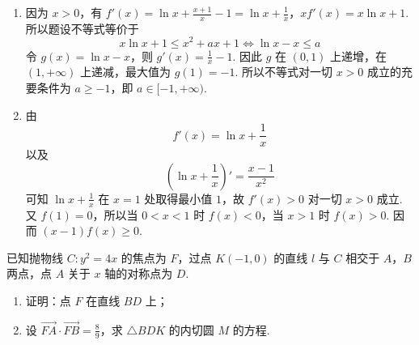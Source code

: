 \begin{solution}
\begin{enumerate}
\item 因为 \(x>0\)，有
\(f'(x)=\ln x+\frac{x+1}{x}-1=\ln x+\frac1x\)，\(xf'(x)=x\ln x+1\).
所以题设不等式等价于
\[
x\ln x+1\leqslant x^{2}+ax+1
\Longleftrightarrow \ln x-x\leqslant a
\]
令 \(g(x)=\ln x-x\)，则 \(g'(x)=\frac{1}{x}-1\). 因此 \(g\) 在 \((0,1)\) 上递增，在
\((1,+\infty)\) 上递减，最大值为 \(g(1)=-1\). 所以不等式对一切 \(x>0\) 成立的充要条件为
\(a\geqslant-1\)，即 \(a\in[-1,+\infty)\).
\item 由
\[
f'(x)=\ln x+\frac1x
\]
以及
\[
\left(\ln x+\frac1x\right)'=\frac{x-1}{x^{2}}
\]
可知 \(\ln x+\frac{1}{x}\) 在 \(x=1\) 处取得最小值 \(1\)，故 \(f'(x)>0\) 对一切 \(x>0\) 成立. 又
\(f(1)=0\)，所以当 \(0<x<1\) 时 \(f(x)<0\)，当 \(x>1\) 时 \(f(x)>0\). 因而
\((x-1)f(x)\geqslant0\).
\end{enumerate}
\end{solution}

\begin{problem}
已知抛物线 \(C: y^{2} = 4x\) 的焦点为 \(F\)，过点 \(K(-1,0)\) 的直线 \(l\) 与 \(C\) 相交于 \(A\)，\(B\) 两点，点 \(A\) 关于 \(x\) 轴的对称点为 \(D\).
\begin{enumerate}
\item 证明：点 \(F\) 在直线 \(BD\) 上；
\item 设 \(\overrightarrow{FA} \cdot \overrightarrow{FB} = \frac{8}{9}\)，求 \(\triangle BDK\) 的内切圆 \(M\) 的方程.
\end{enumerate}
\end{problem}

